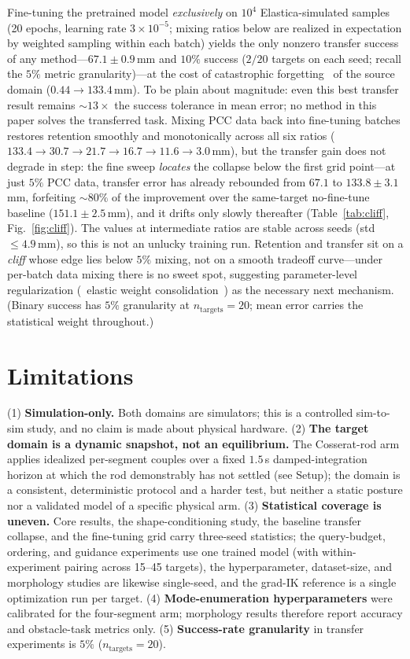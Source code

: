 Fine-tuning the pretrained model \emph{exclusively} on $10^4$
Elastica-simulated samples (20 epochs, learning rate $3{\times}10^{-5}$;
mixing ratios below are realized in expectation by weighted sampling within
each batch) yields the
only nonzero transfer success of any
method---$67.1\pm0.9\,$mm and $10\%$ success ($2/20$ targets on each seed;
recall the $5\%$ metric granularity)---at the cost of catastrophic
forgetting~\cite{kirkpatrick2017overcoming} of the source domain ($0.44
\rightarrow 133.4\,$mm). To be plain about magnitude: even this best
transfer result remains ${\sim}13\times$ the success tolerance in mean
error; no method in this paper solves the transferred task. Mixing PCC data back into fine-tuning batches
restores retention smoothly and monotonically across all six ratios
($133.4 \rightarrow 30.7 \rightarrow 21.7 \rightarrow 16.7 \rightarrow 11.6
\rightarrow 3.0\,$mm), but the transfer gain does not degrade in step: the
fine sweep \emph{locates} the collapse below the first grid point---at just
$5\%$ PCC data, transfer error has already rebounded from $67.1$ to
$133.8\pm3.1\,$mm, forfeiting ${\sim}80\%$ of the improvement over the
same-target no-fine-tune baseline ($151.1\pm2.5\,$mm), and it drifts only
slowly thereafter
(Table~\ref{tab:cliff}, Fig.~\ref{fig:cliff}). The values at intermediate
ratios are stable across seeds (std $\leq 4.9\,$mm), so this is not an
unlucky training run. Retention and transfer sit on a \emph{cliff} whose
edge lies below $5\%$ mixing, not on a smooth tradeoff curve---under
per-batch data mixing there is no sweet spot, suggesting parameter-level
regularization (\eg\ elastic weight
consolidation~\cite{kirkpatrick2017overcoming}) as the necessary next
mechanism. (Binary success has $5\%$ granularity at
$n_\text{targets}{=}20$; mean error carries the statistical weight
throughout.)

\section{Limitations}
\label{sec:limitations}
(1) \textbf{Simulation-only.} Both domains are simulators; this is a
controlled sim-to-sim study, and no claim is made about physical hardware.
(2) \textbf{The target domain is a dynamic snapshot, not an equilibrium.}
The Cosserat-rod arm applies idealized per-segment couples over a fixed
$1.5\,$s damped-integration horizon at which the rod demonstrably has not
settled (see Setup); the domain is a consistent, deterministic protocol and
a harder test, but neither a static posture nor a validated model of a
specific physical arm. (3)
\textbf{Statistical coverage is uneven.} Core results, the shape-conditioning
study, the baseline transfer collapse, and the fine-tuning grid carry
three-seed statistics; the query-budget, ordering, and guidance experiments
use one trained model (with within-experiment pairing across 15--45 targets),
the hyperparameter, dataset-size, and morphology studies are likewise
single-seed, and the grad-IK reference is a single optimization run per
target.
(4) \textbf{Mode-enumeration hyperparameters} were calibrated for the
four-segment arm; morphology results therefore report accuracy and
obstacle-task metrics only. (5) \textbf{Success-rate granularity} in transfer
experiments is $5\%$ ($n_\text{targets}{=}20$).

